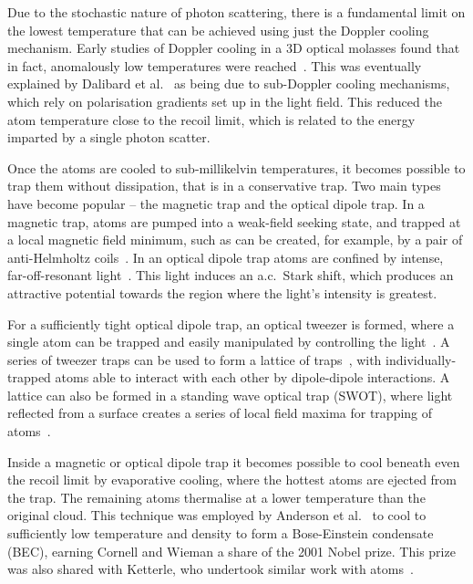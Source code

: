 Due to the stochastic nature of photon scattering, there is a fundamental limit
on the lowest temperature that can be achieved using just the Doppler cooling 
mechanism.  Early studies of Doppler cooling in a 3D optical molasses
found that in fact, anomalously low temperatures
were reached~\cite{Lett1988}. This was eventually explained by
Dalibard et al.~\cite{Dalibard:89} as being due to sub-Doppler cooling
mechanisms, which rely on polarisation gradients set up in the light field.
This reduced the atom temperature close to the recoil limit, which is
related to the energy imparted by a single photon scatter.

Once the atoms are cooled to sub-millikelvin temperatures, it becomes possible
to trap them without dissipation, that is in a conservative trap. Two main
types have become popular -- the magnetic trap and the optical dipole trap. In
a magnetic trap, atoms are pumped into a weak-field seeking state, and trapped
at a local magnetic field minimum, such as can be created, for example, by a
pair of anti-Helmholtz coils~\cite{PhysRevLett.54.2596}. In an optical dipole
trap atoms are confined by intense, far-off-resonant light~\cite{Chu1986}. This
light induces an a.c.\ Stark shift, which produces an attractive potential
towards the region where the light's intensity is greatest.

For a sufficiently tight optical dipole trap, an optical tweezer is formed,
where a single atom can be trapped and easily manipulated by controlling the
light~\cite{Schlosser2001}. A series of tweezer traps can be used to form a
lattice of traps~\cite{Schlosser2001}, with individually-trapped atoms able to
interact with each other by dipole-dipole interactions. A lattice can also be
formed in a standing wave optical trap (SWOT), where light reflected from a
surface creates a series of local field maxima for trapping of
atoms~\cite{Wu2017}.

Inside a magnetic or optical dipole trap it becomes possible to cool beneath
even the recoil limit by evaporative cooling, where the hottest atoms are
ejected from the trap. The remaining atoms thermalise at a lower temperature
than the original cloud. This technique was employed by Anderson et
al.~\cite{Anderson198} to cool \esRb{} to sufficiently low temperature and
density to form a Bose-Einstein condensate (BEC), earning Cornell and Wieman a
share of the 2001 Nobel prize. This prize was also shared with Ketterle, who
undertook similar work with \Na{} atoms~\cite{PhysRevLett.75.3969}.

